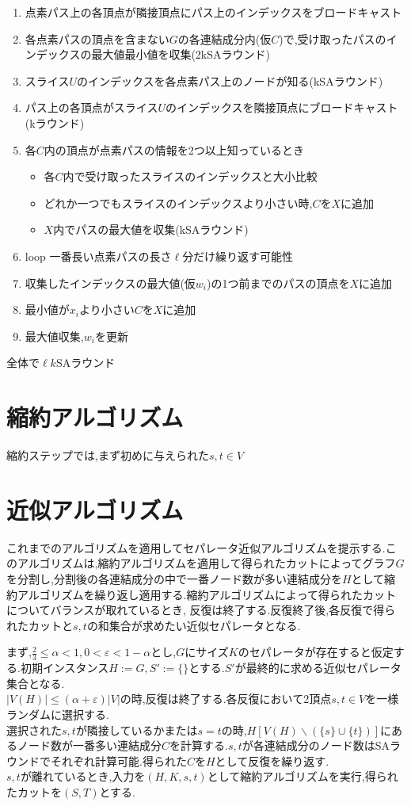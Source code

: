 \documentclass{thesis}
\theoremstyle{definition}
\begin{document}
\begin{enumerate}
    \item 点素パス上の各頂点が隣接頂点にパス上のインデックスをブロードキャスト
    \item 各点素パスの頂点を含まない$G$の各連結成分内(仮$C$)で,受け取ったパスのインデックスの最大値最小値を収集(2kSAラウンド)
    \item スライス$U$のインデックスを各点素パス上のノードが知る(kSAラウンド)
    \item パス上の各頂点がスライス$U$のインデックスを隣接頂点にブロードキャスト(kラウンド)
    \item 各$C$内の頂点が点素パスの情報を2つ以上知っているとき
    \begin{itemize}
      \item 各$C$内で受け取ったスライスのインデックスと大小比較
      \item どれか一つでもスライスのインデックスより小さい時,$C$を$X$に追加
      \item $X$内でパスの最大値を収集(kSAラウンド)
    \end{itemize}
    \item loop 一番長い点素パスの長さ$\ell$分だけ繰り返す可能性
    \item 収集したインデックスの最大値(仮$w_i$)の1つ前までのパスの頂点を$X$に追加
    \item 最小値が$x_i$より小さい$C$を$X$に追加
    \item 最大値収集,$w_i$を更新
  \end{enumerate}
全体で$\ell k$SAラウンド

\section{縮約アルゴリズム}
縮約ステップでは,まず初めに与えられた$s,t\in V$

\section{近似アルゴリズム}
これまでのアルゴリズムを適用してセパレータ近似アルゴリズムを提示する.このアルゴリズムは,縮約アルゴリズムを適用して得られたカットによってグラフ$G$を分割し,分割後の各連結成分の中で一番ノード数が多い連結成分を$H$として縮約アルゴリズムを繰り返し適用する.縮約アルゴリズムによって得られたカットについてバランスが取れているとき, 反復は終了する.反復終了後,各反復で得られたカットと$s,t$の和集合が求めたい近似セパレータとなる.\par
まず,$\frac{2}{3} \leq \alpha < 1,0 < \varepsilon < 1-\alpha$とし,$G$にサイズ$K$のセパレータが存在すると仮定する.初期インスタンス$H:=G,S':= \{\}$とする.$S'$が最終的に求める近似セパレータ集合となる.\\
$|V(H)|\leq (\alpha + \varepsilon)|V|$の時,反復は終了する.各反復において2頂点$s,t \in V$を一様ランダムに選択する.\\
選択された$s,t$が隣接しているかまたは$s = t$の時,$H[V(H) \backslash (\{s\} \cup \{t\})]$にあるノード数が一番多い連結成分$C$を計算する.$s,t$が各連結成分のノード数はSAラウンドでそれぞれ計算可能.得られた$C$を$H$として反復を繰り返す.\\
$s,t$が離れているとき,入力を$(H,K,s,t)$として縮約アルゴリズムを実行,得られたカットを$(S,T)$とする.
\end{document}

